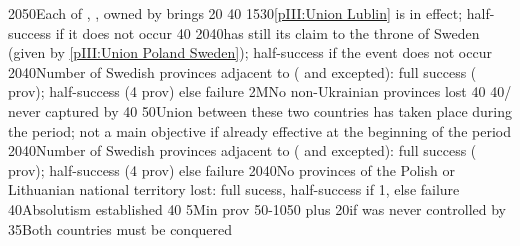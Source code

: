 %
%
%
{20}{50}{Each of \provinceKurland, \provinceMemel, \provincePreussen owned by
  \paysmajeurPologne brings 20\VPs}%
%
%
{}{40}{}%
%
%
{15}{30}{\ref{pIII:Union Lublin} is in effect; half-success if it does not
  occur}%
%
%
{}{40}{}%
%
%
{20}{40}{\POL has still its claim to the throne of Sweden (given by
  \ref{pIII:Union Poland Sweden}); half-success if the event does not occur}%
%
%
%
{20}{40}{Number of Swedish provinces adjacent to \regionBaltique (\regionSuede
  and \regionFinlande excepted): full success ( prov);
  half-success (4 prov) else failure}%
%
\EUobjective2M{No non-Ukrainian provinces lost}{}%
{}{40}{}%
%
%
{}{40}{\provinceOsterreich/ never captured by
  }%
%
%
{}{40}{}%
%
%
%
{}{50}{Union between these two countries has taken place during the period;
  not a main objective if already effective at the beginning of the period}%
%
%
%
{20}{40}{Number of Swedish provinces adjacent to \regionBaltique (\regionSuede
  and \regionFinlande excepted): full success ( prov);
  half-success (4 prov) else failure}%
%
%
{20}{40}{No provinces of the Polish or Lithuanian national territory lost:
  full sucess, half-success if 1, else failure}%
%
%
{}{40}{Absolutism established}%
%
%
{}{40}{}%
%
\EUobjective5M{\TUR in \payshongrie}{prov}%
{50-10}{50}{ plus 20\VPs if \villeVienne was never
  controlled by \paysmajeurTurquie}%
%
 
%
%
{}{35}{Both countries must be conquered}%
%
%
